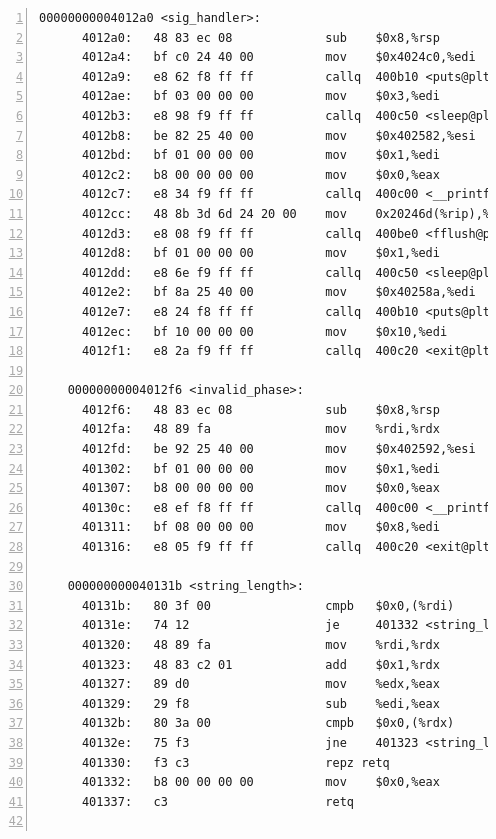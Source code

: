 \documentclass{article}
\begin{document}
\begin{lstlisting}[title = bomb的反汇编代码及部分注释, xleftmargin = 2em,xrightmargin = 2em, aboveskip = 1em, numbers = left, basicstyle=\scriptsize\ttfamily, numberstyle=\scriptsize]
    00000000004012a0 <sig_handler>:
      4012a0:	48 83 ec 08          	sub    $0x8,%rsp
      4012a4:	bf c0 24 40 00       	mov    $0x4024c0,%edi
      4012a9:	e8 62 f8 ff ff       	callq  400b10 <puts@plt>
      4012ae:	bf 03 00 00 00       	mov    $0x3,%edi
      4012b3:	e8 98 f9 ff ff       	callq  400c50 <sleep@plt>
      4012b8:	be 82 25 40 00       	mov    $0x402582,%esi
      4012bd:	bf 01 00 00 00       	mov    $0x1,%edi
      4012c2:	b8 00 00 00 00       	mov    $0x0,%eax
      4012c7:	e8 34 f9 ff ff       	callq  400c00 <__printf_chk@plt>
      4012cc:	48 8b 3d 6d 24 20 00 	mov    0x20246d(%rip),%rdi        # 603740 <stdout@@GLIBC_2.2.5>
      4012d3:	e8 08 f9 ff ff       	callq  400be0 <fflush@plt>
      4012d8:	bf 01 00 00 00       	mov    $0x1,%edi
      4012dd:	e8 6e f9 ff ff       	callq  400c50 <sleep@plt>
      4012e2:	bf 8a 25 40 00       	mov    $0x40258a,%edi
      4012e7:	e8 24 f8 ff ff       	callq  400b10 <puts@plt>
      4012ec:	bf 10 00 00 00       	mov    $0x10,%edi
      4012f1:	e8 2a f9 ff ff       	callq  400c20 <exit@plt>
    
    00000000004012f6 <invalid_phase>:
      4012f6:	48 83 ec 08          	sub    $0x8,%rsp
      4012fa:	48 89 fa             	mov    %rdi,%rdx
      4012fd:	be 92 25 40 00       	mov    $0x402592,%esi
      401302:	bf 01 00 00 00       	mov    $0x1,%edi
      401307:	b8 00 00 00 00       	mov    $0x0,%eax
      40130c:	e8 ef f8 ff ff       	callq  400c00 <__printf_chk@plt>
      401311:	bf 08 00 00 00       	mov    $0x8,%edi
      401316:	e8 05 f9 ff ff       	callq  400c20 <exit@plt>
    
    000000000040131b <string_length>:
      40131b:	80 3f 00             	cmpb   $0x0,(%rdi)
      40131e:	74 12                	je     401332 <string_length+0x17>
      401320:	48 89 fa             	mov    %rdi,%rdx
      401323:	48 83 c2 01          	add    $0x1,%rdx
      401327:	89 d0                	mov    %edx,%eax
      401329:	29 f8                	sub    %edi,%eax
      40132b:	80 3a 00             	cmpb   $0x0,(%rdx)
      40132e:	75 f3                	jne    401323 <string_length+0x8>
      401330:	f3 c3                	repz retq 
      401332:	b8 00 00 00 00       	mov    $0x0,%eax
      401337:	c3                   	retq   
    

\end{lstlisting}
\end{document}
